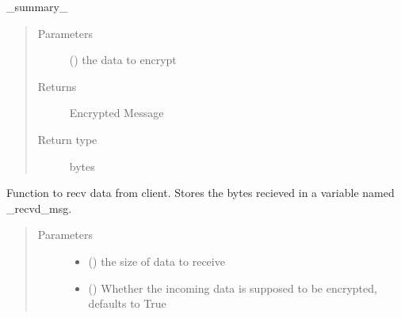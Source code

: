 \documentclass[letterpaper,10pt,english]{sphinxmanual}
\begin{document}
\begin{fulllineitems}
\begin{fulllineitems}
\end{fulllineitems}


\begin{fulllineitems}
\label{\detokenize{Message:Message.Message.encrypt}}
\_summary\_
\begin{quote}\begin{description}
\item[{Parameters}] \leavevmode
{} () \textendash{} the data to encrypt

\item[{Returns}] \leavevmode
Encrypted Message

\item[{Return type}] \leavevmode
bytes

\end{description}\end{quote}

\end{fulllineitems}


\begin{fulllineitems}
\label{\detokenize{Message:Message.Message._recv_data_from_client}}
Function to recv data from client. Stores the bytes recieved in a variable named \_recvd\_msg.
\begin{quote}\begin{description}
\item[{Parameters}] \leavevmode\begin{itemize}
\item {} 
 () \textendash{} the size of data to receive

\item {} 
 (\sphinxstyleliteralemphasis{\sphinxupquote{, }}) \textendash{} Whether the incoming data is supposed to be encrypted, defaults to True


\end{itemize}
\end{description}
\end{quote}
\end{fulllineitems}
\end{fulllineitems}
\end{document}
